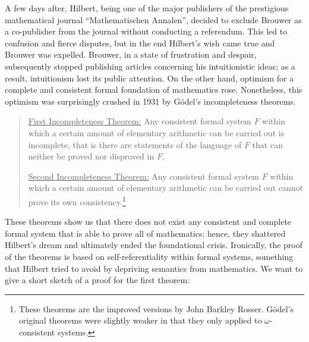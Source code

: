 \documentclass{article}
\begin{document}
A few days after, Hilbert, being one of the major publishers of the prestigious mathematical journal ``Mathematischen Annalen'', decided to exclude Brouwer as a co-publisher from the journal without conducting a referendum. This led to confusion and fierce disputes, but in the end Hilbert's wish came true and Brouwer was expelled. Brouwer, in a state of frustration and despair, subsequently stopped publishing articles concerning his intuitionistic ideas; as a result, intuitionism lost its public attention.
On the other hand, optimism for a complete and consistent formal foundation of mathematics rose. Nonetheless, this optimism was surprisingly crushed in 1931 by Gödel's incompleteness theorems.
\begin{quote}
\underline{First Incompleteness Theorem:} Any consistent formal system $F$ within which a certain amount of elementary arithmetic can be carried out is incomplete, that is there are statements of the language of $F$ that can neither be proved nor disproved in $F$.

\underline{Second Incompleteness Theorem:} Any consistent formal system $F$ within which a certain amount of elementary arithmetic can be carried out cannot prove its own consistency.\footnote{These theorems are the improved versions by John Barkley Rosser. Gödel's original theorems were slightly weaker in that they only applied to $\omega$-consistent systems.\cite[pp.~293--320]{fraenkel}}
\end{quote}
These theorems show us that there does not exist any consistent and complete formal system that is able to prove all of mathematics; hence, they shattered Hilbert's dream and ultimately ended the foundational crisis. Ironically, the proof of the theorems is based on self-referentiality within formal systems, something that Hilbert tried to avoid by depriving semantics from mathematics.
We want to give a short sketch of a proof for the first theorem:
\end{document}
